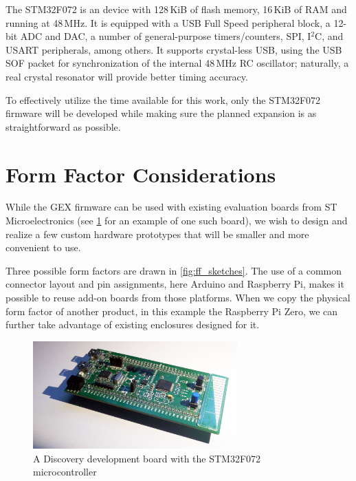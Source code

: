The STM32F072 is an \armcm device with 128\,KiB of flash memory, 16\,KiB of \gls{RAM} and running at 48\,MHz. It is equipped with a \gls{USB} Full Speed peripheral block, a 12-bit \gls{ADC} and \gls{DAC}, a number of general-purpose timers/counters, SPI, I$^2$C, and USART peripherals, among others. It supports crystal-less \gls{USB}, using the USB SOF packet for synchronization of the internal 48\,MHz RC oscillator; naturally, a real crystal resonator will provide better timing accuracy.

To effectively utilize the time available for this work, only the STM32F072 firmware will be developed while making sure the planned expansion is as straightforward as possible.

\section{Form Factor Considerations} \label{sec:formfactors}

While the GEX firmware can be used with existing evaluation boards from ST Microelectronics (see \cref{fig:discovery} for an example of one such board), we wish to design and realize a few custom hardware prototypes that will be smaller and more convenient to use.

Three possible form factors are drawn in \cref{fig:ff_sketches}. The use of a common connector layout and pin assignments, here Arduino and Raspberry Pi, makes it possible to reuse add-on boards from those platforms. When we copy the physical form factor of another product, in this example the Raspberry Pi Zero, we can further take advantage of existing enclosures designed for it.

\begin{figure}[h]
	\centering
	\includegraphics[width=0.7\textwidth] {img/disco072.jpg}
	\caption[A Discovery board with STM32F072]{\label{fig:discovery}A Discovery development board with the STM32F072 microcontroller}
\end{figure}

